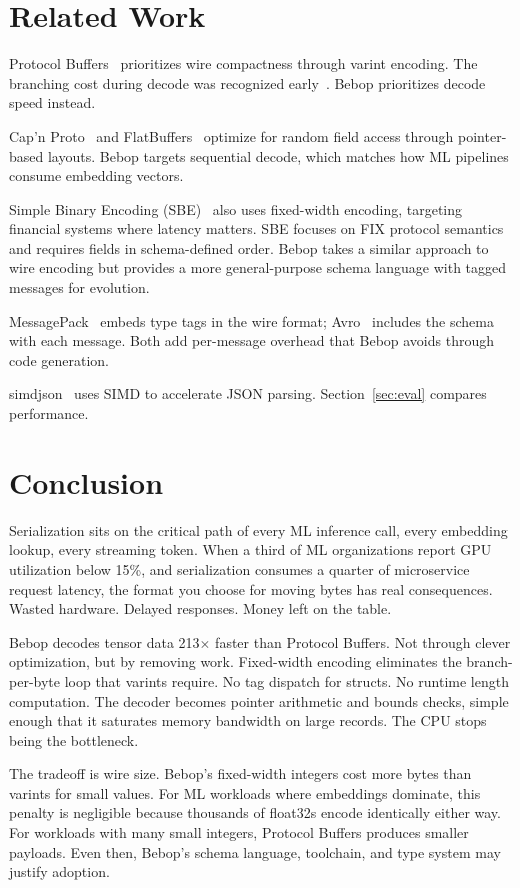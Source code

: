 \documentclass[11pt,onecolumn]{article}
\begin{document}
\section{Related Work}

Protocol Buffers~\cite{protobuf} prioritizes wire compactness through varint encoding. The branching cost during decode was recognized early~\cite{varda-hn}. Bebop prioritizes decode speed instead.

Cap'n Proto~\cite{capnproto} and FlatBuffers~\cite{flatbuffers} optimize for random field access through pointer-based layouts. Bebop targets sequential decode, which matches how ML pipelines consume embedding vectors.

Simple Binary Encoding (SBE)~\cite{sbe} also uses fixed-width encoding, targeting financial systems where latency matters. SBE focuses on FIX protocol semantics and requires fields in schema-defined order. Bebop takes a similar approach to wire encoding but provides a more general-purpose schema language with tagged messages for evolution.

MessagePack~\cite{msgpack} embeds type tags in the wire format; Avro~\cite{avro} includes the schema with each message. Both add per-message overhead that Bebop avoids through code generation.

simdjson~\cite{simdjson} uses SIMD to accelerate JSON parsing. Section~\ref{sec:eval} compares performance.


\section{Conclusion}

Serialization sits on the critical path of every ML inference call, every embedding lookup, every streaming token. When a third of ML organizations report GPU utilization below 15\%, and serialization consumes a quarter of microservice request latency, the format you choose for moving bytes has real consequences. Wasted hardware. Delayed responses. Money left on the table.

Bebop decodes tensor data 213$\times$ faster than Protocol Buffers. Not through clever optimization, but by removing work. Fixed-width encoding eliminates the branch-per-byte loop that varints require. No tag dispatch for structs. No runtime length computation. The decoder becomes pointer arithmetic and bounds checks, simple enough that it saturates memory bandwidth on large records. The CPU stops being the bottleneck.

The tradeoff is wire size. Bebop's fixed-width integers cost more bytes than varints for small values. For ML workloads where embeddings dominate, this penalty is negligible because thousands of float32s encode identically either way. For workloads with many small integers, Protocol Buffers produces smaller payloads. Even then, Bebop's schema language, toolchain, and type system may justify adoption.
\end{document}
